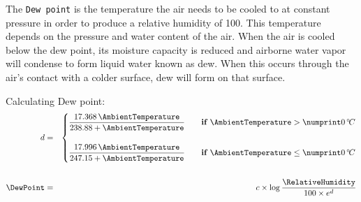 The \texttt{Dew point} is the temperature the air needs to be cooled to at constant pressure in order
to produce a relative humidity of 100\percent.
This temperature depends on the pressure and water content of the air.
When the air is cooled below the dew point, its moisture capacity is reduced and
airborne water vapor will condense to form liquid water known as dew.
When this occurs through the air's contact with a colder surface, dew will form on that surface.

\begin{definition}
Calculating Dew point:
\begin{eqnarray*}
        d &=& \begin{cases}
            \dfrac{ 17.368\,\AmbientTemperature }{ 238.88 + \AmbientTemperature } & \quad \textbf{if } \AmbientTemperature > \Celsius{0}\\
            \\
            \dfrac{ 17.996\,\AmbientTemperature }{ 247.15 + \AmbientTemperature } & \quad \textbf{if } \AmbientTemperature \leq \Celsius{0}
        \end{cases} \\
        \\
        \DewPoint &=& c \times \log{ \dfrac{\RelativeHumidity}{100 \times e^d}}
\end{eqnarray*}

\end{definition}

